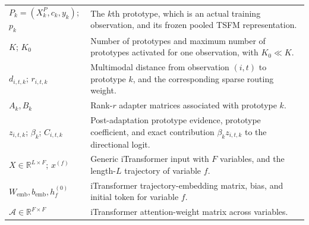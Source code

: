 \documentclass[11pt]{article}
\newcommand{\R}{\mathbb{R}}
\begin{document}
{\begin{longtable}{@{}p{}p{}@{}}
$P_k=(X_k^P,c_k,y_k)$; $p_k$ & The $k$th prototype, which is an actual training observation, and its frozen pooled TSFM representation. \\
$K$; $K_0$ & Number of prototypes and maximum number of prototypes activated for one observation, with $K_0\ll K$. \\
$d_{i,t,k}$; $r_{i,t,k}$ & Multimodal distance from observation $(i,t)$ to prototype $k$, and the corresponding sparse routing weight. \\
$A_k,B_k$ & Rank-$r$ adapter matrices associated with prototype $k$. \\
$z_{i,t,k}$; $\beta_k$; $C_{i,t,k}$ & Post-adaptation prototype evidence, prototype coefficient, and exact contribution $\beta_kz_{i,t,k}$ to the directional logit. \\
$X\in\R^{L\times F}$; $x^{(f)}$ & Generic iTransformer input with $F$ variables, and the length-$L$ trajectory of variable $f$. \\
$W_{\mathrm{emb}},b_{\mathrm{emb}},h_f^{(0)}$ & iTransformer trajectory-embedding matrix, bias, and initial token for variable $f$. \\
$\mathcal A\in\R^{F\times F}$ & iTransformer attention-weight matrix across variables. \\
\bottomrule
\end{longtable}

}
\end{document}
